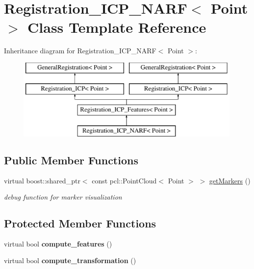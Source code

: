 \hypertarget{classRegistration__ICP__NARF}{
\section{Registration\_\-ICP\_\-NARF$<$ Point $>$ Class Template Reference}
\label{classRegistration__ICP__NARF}
}
Inheritance diagram for Registration\_\-ICP\_\-NARF$<$ Point $>$:\begin{figure}[H]
\begin{center}
\leavevmode
\includegraphics[height=4.000000cm]{classRegistration__ICP__NARF}
\end{center}
\end{figure}
\subsection*{Public Member Functions}
\begin{DoxyCompactItemize}
\item 
\hypertarget{classRegistration__ICP__NARF_ae0aeb380bf05e1d7d58c5c690a97bdfe}{
virtual boost::shared\_\-ptr$<$ const pcl::PointCloud$<$ Point $>$ $>$ \hyperlink{classRegistration__ICP__NARF_ae0aeb380bf05e1d7d58c5c690a97bdfe}{getMarkers} ()}
\label{classRegistration__ICP__NARF_ae0aeb380bf05e1d7d58c5c690a97bdfe}

\begin{DoxyCompactList}\small\item\em debug function for marker visualization \item\end{DoxyCompactList}\end{DoxyCompactItemize}
\subsection*{Protected Member Functions}
\begin{DoxyCompactItemize}
\item 
\hypertarget{classRegistration__ICP__NARF_af3a81b95182d0a3220293eb4d88bf78b}{
virtual bool {\bfseries compute\_\-features} ()}
\label{classRegistration__ICP__NARF_af3a81b95182d0a3220293eb4d88bf78b}

\item 
\hypertarget{classRegistration__ICP__NARF_aabcabb41826a7ef97fc2f9709312ab5d}{
virtual bool {\bfseries compute\_\-transformation} ()}
\label{classRegistration__ICP__NARF_aabcabb41826a7ef97fc2f9709312ab5d}

\end{DoxyCompactItemize}

